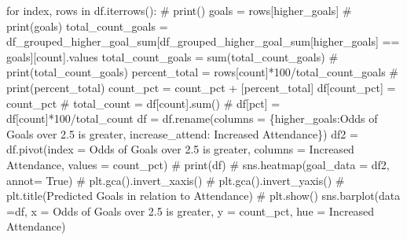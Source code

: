 \documentclass[
  letterpaper,
  DIV=11,
  numbers=noendperiod]{scrartcl}
\newenvironment{Shaded}{\begin{snugshade}}{\end{snugshade}}
\newcommand{\BuiltInTok}[1]{\textcolor[rgb]{0.00,0.23,0.31}{#1}}
\newcommand{\CommentTok}[1]{\textcolor[rgb]{0.37,0.37,0.37}{#1}}
\newcommand{\ControlFlowTok}[1]{\textcolor[rgb]{0.00,0.23,0.31}{#1}}
\newcommand{\DecValTok}[1]{\textcolor[rgb]{0.68,0.00,0.00}{#1}}
\newcommand{\KeywordTok}[1]{\textcolor[rgb]{0.00,0.23,0.31}{#1}}
\newcommand{\NormalTok}[1]{\textcolor[rgb]{0.00,0.23,0.31}{#1}}
\newcommand{\OperatorTok}[1]{\textcolor[rgb]{0.37,0.37,0.37}{#1}}
\newcommand{\StringTok}[1]{\textcolor[rgb]{0.13,0.47,0.30}{#1}}
\begin{document}
\begin{Shaded}
\begin{Highlighting}[]
\ControlFlowTok{for}\NormalTok{ index, rows }\KeywordTok{in}\NormalTok{ df.iterrows():}
    \CommentTok{\# print(\textquotesingle{}{-}{-}{-}{-}{-}{-}{-}{-}{-}{-}\textquotesingle{})}
\NormalTok{    goals }\OperatorTok{=}\NormalTok{ rows[}\StringTok{\textquotesingle{}higher\_goals\textquotesingle{}}\NormalTok{]}
    \CommentTok{\# print(goals)}
\NormalTok{    total\_count\_goals }\OperatorTok{=}\NormalTok{ df\_grouped\_higher\_goal\_sum[df\_grouped\_higher\_goal\_sum[}\StringTok{\textquotesingle{}higher\_goals\textquotesingle{}}\NormalTok{] }\OperatorTok{==}\NormalTok{ goals][}\StringTok{\textquotesingle{}count\textquotesingle{}}\NormalTok{].values}
\NormalTok{    total\_count\_goals }\OperatorTok{=} \BuiltInTok{sum}\NormalTok{(total\_count\_goals)}
    \CommentTok{\# print(total\_count\_goals)}
\NormalTok{    percent\_total }\OperatorTok{=}\NormalTok{ rows[}\StringTok{\textquotesingle{}count\textquotesingle{}}\NormalTok{]}\OperatorTok{*}\DecValTok{100}\OperatorTok{/}\NormalTok{total\_count\_goals}
    \CommentTok{\# print(percent\_total)}
\NormalTok{    count\_pct }\OperatorTok{=}\NormalTok{ count\_pct }\OperatorTok{+}\NormalTok{ [percent\_total]}
\NormalTok{df[}\StringTok{\textquotesingle{}count\_pct\textquotesingle{}}\NormalTok{] }\OperatorTok{=}\NormalTok{ count\_pct}
\CommentTok{\# total\_count = df[\textquotesingle{}count\textquotesingle{}].sum()}
\CommentTok{\# df[\textquotesingle{}pct\textquotesingle{}] = df[\textquotesingle{}count\textquotesingle{}]*100/total\_count}
\NormalTok{df }\OperatorTok{=}\NormalTok{ df.rename(columns }\OperatorTok{=}\NormalTok{ \{}\StringTok{\textquotesingle{}higher\_goals\textquotesingle{}}\NormalTok{:}\StringTok{\textquotesingle{}Odds of Goals over 2.5 is greater\textquotesingle{}}\NormalTok{, }\StringTok{\textquotesingle{}increase\_attend\textquotesingle{}}\NormalTok{: }\StringTok{\textquotesingle{}Increased Attendance\textquotesingle{}}\NormalTok{\})}
\NormalTok{df2 }\OperatorTok{=}\NormalTok{ df.pivot(index }\OperatorTok{=} \StringTok{\textquotesingle{}Odds of Goals over 2.5 is greater\textquotesingle{}}\NormalTok{, columns }\OperatorTok{=} \StringTok{\textquotesingle{}Increased Attendance\textquotesingle{}}\NormalTok{, values }\OperatorTok{=} \StringTok{\textquotesingle{}count\_pct\textquotesingle{}}\NormalTok{)}
\CommentTok{\# print(df)}
\CommentTok{\# sns.heatmap(goal\_data = df2, annot= True)}
\CommentTok{\# plt.gca().invert\_xaxis()}
\CommentTok{\# plt.gca().invert\_yaxis()}
\CommentTok{\# plt.title(\textquotesingle{}Predicted Goals in relation to Attendance\textquotesingle{})}
\CommentTok{\# plt.show()}
\NormalTok{sns.barplot(data }\OperatorTok{=}\NormalTok{df, x }\OperatorTok{=} \StringTok{\textquotesingle{}Odds of Goals over 2.5 is greater\textquotesingle{}}\NormalTok{, y }\OperatorTok{=} \StringTok{\textquotesingle{}count\_pct\textquotesingle{}}\NormalTok{, hue }\OperatorTok{=} \StringTok{\textquotesingle{}Increased Attendance\textquotesingle{}}\NormalTok{)}

\end{Highlighting}
\end{Shaded}
\end{document}
